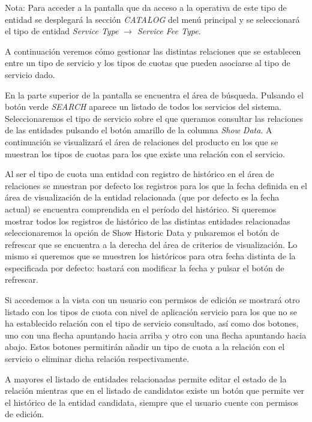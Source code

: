 Nota: Para acceder a la pantalla que da acceso a la operativa de este tipo de entidad se desplegará la sección \emph{CATALOG} del menú principal y se seleccionará el tipo de entidad \emph{Service Type} $\rightarrow$  \emph{Service Fee Type}.


A continuación veremos cómo gestionar las distintas relaciones que se establecen entre un tipo de servicio y los tipos de cuotas que pueden asociarse al tipo de servicio dado.


En la parte superior de la pantalla se encuentra el área de búsqueda. Pulsando el botón verde \emph{SEARCH} aparece un listado de todos los servicios del sistema. Seleccionaremos el tipo de servicio sobre el que queramos consultar las relaciones de las entidades pulsando el botón amarillo de la columna \emph{Show Data}. A continuación se visualizará el área de relaciones del producto en los que se muestran los tipos de cuotas para los que existe una relación con el servicio.

Al ser el tipo de cuota una entidad con registro de histórico en el área de relaciones se muestran por defecto los registros para los que la fecha definida en el área de visualización de la entidad relacionada (que por defecto es la fecha actual) se encuentra comprendida en el período del histórico. Si queremos mostrar todos los registros de histórico de las distintas entidades relacionadas seleccionaremos la opción de Show Historic Data y pulsaremos el botón de refrescar que se encuentra a la derecha del área de criterios de visualización. Lo mismo si queremos que se muestren los históricos para otra fecha distinta de la especificada por defecto: bastará con modificar la fecha y pulsar el botón de refrescar.

Si accedemos a la vista con un usuario con permisos de edición se mostrará otro listado con los tipos de cuota con nivel de aplicación servicio para los que no se ha establecido relación con el tipo de servicio consultado, así como dos botones, uno con una flecha apuntando hacia arriba y otro con una flecha apuntando hacia abajo. Estos botones permitirán añadir un tipo de cuota a la relación con el servicio o eliminar dicha relación respectivamente. 

A mayores el listado de entidades relacionadas permite editar el estado de la relación mientras que en el listado de candidatos existe un botón que permite ver el histórico de la entidad candidata, siempre que el usuario cuente con permisos de edición.



